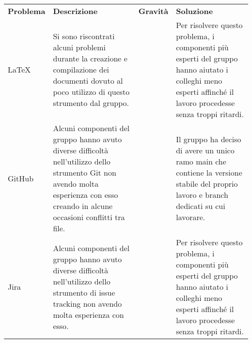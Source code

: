 \begin{table}[H]
    \caption{Tabella delle problematiche relative agli strumenti di lavoro}
\renewcommand{\arraystretch}{1.5}
\begin{longtable}{  >{\centering}p{} >{}p{}
    >{\centering}p{} >{}p{}}
    \rowcolor{\primaryColor}
    \textcolor{\secondaryColor}{
    \centering\textbf{Problema}}     & \textcolor{\secondaryColor}{\centering\textbf{Descrizione}}    & \textcolor{\secondaryColor}
    {\centering\textbf{Gravità}} & \textcolor{\secondaryColor}{\centering\textbf{Soluzione}}\\
   
    \LaTeX{} 
    & Si sono riscontrati alcuni problemi durante la creazione e compilazione dei documenti 
    dovuto al poco utilizzo di questo strumento dal gruppo.
    & 1  
    & Per risolvere questo problema, i componenti più esperti del gruppo hanno 
    aiutato i colleghi meno esperti affinché il lavoro procedesse senza troppi ritardi. {} \\
    GitHub
    & Alcuni componenti del gruppo hanno avuto diverse difficoltà nell’utilizzo 
    dello strumento Git non avendo molta esperienza con esso creando in alcune occasioni conflitti tra file. 
    & 2
    & Il gruppo ha deciso di avere un unico ramo main che contiene la versione stabile del proprio 
    lavoro e branch dedicati su cui lavorare. {} \\
    Jira
    & Alcuni componenti del gruppo hanno avuto diverse difficoltà nell’utilizzo 
    dello strumento di issue tracking non avendo molta esperienza con esso. 
    & 2
    & Per risolvere questo problema, i componenti più esperti del gruppo hanno 
    aiutato i colleghi meno esperti affinché il lavoro procedesse senza troppi ritardi. {} \\
    \end{longtable}
\end{table}
